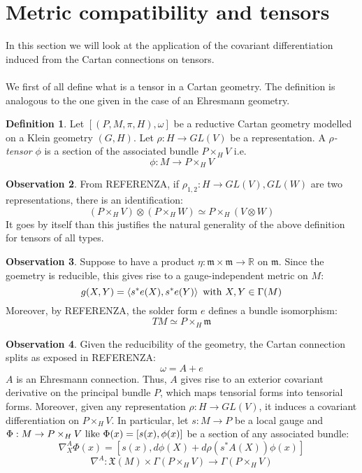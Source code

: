 \documentclass[12pt,a4paper]{report}
\theoremstyle{definition}
\newtheorem{Def}{Definition}[chapter]
\theoremstyle{Theorem}
\theoremstyle{definition}
\theoremstyle{definition}
\newtheorem{Obs}[Def]{Observation}
\begin{document}
	\section{Metric compatibility and tensors}
	In this section we will look at the application of the covariant differentiation induced from the Cartan connections on tensors.\\
	\\
	We first of all define what is a tensor in a Cartan geometry. The definition is analogous to the one given in the case of an Ehresmann geometry.
	\begin{Def}
		Let $[(P,M,\pi,H),\omega]$ be a reductive Cartan geometry modelled on a Klein geometry $(G,H)$. Let $\rho:H\rightarrow GL(V)$ be a representation. A \textit{$\rho$-tensor} $\phi$ is a section of the associated bundle $P\times_H V$ i.e.
		$$\phi:M\rightarrow P\times_H V$$ 
	\end{Def}
	\begin{Obs}
		From REFERENZA, if $\rho_{1,2}:H\rightarrow GL(V),GL(W)$ are two representations, there is an identification:
		$$(P\times_H V)\otimes (P\times_H W)\simeq P\times_H(V\otimes W)$$
		It goes by itself than this justifies the natural generality of the above definition for tensors of all types.
	\end{Obs}
		\begin{Obs}
		Suppose to have a product $\eta:\mathfrak{m}\times \mathfrak{m}\rightarrow \mathbb{R}$ on $\mathfrak{m}$. Since the goemetry is reducible, this gives rise to a gauge-independent metric on $M$:
		$$g(X,Y)=\braket{s^*e(X),s^*e(Y)}\hbox{ with }X,Y\in\Gamma(M)$$
		Moreover, by REFERENZA, the solder form $e$ defines a bundle isomorphism:
		$$TM\simeq P\times_H \mathfrak{m}$$
	\end{Obs}
	\begin{Obs}
		Given the reducibility of the geometry, the Cartan connection splits as exposed in REFERENZA:
		$$\omega=A+e$$
		$A$ is an Ehresmann connection. Thus, $A$ gives rise to an exterior covariant derivative on the principal bundle $P$, which maps tensorial forms into tensorial forms. Moreover, given any representation $\rho:H\rightarrow GL(V)$, it induces a covariant differentiation on $P\times_H V$. In particular, let $s:M\rightarrow P$ be a local gauge and $\Phi:M\rightarrow P\times_H V\hbox{ like }\Phi(x)=[s(x),\phi(x)]$ be a section of any associated bundle: 
		$$\nabla^A_X \Phi(x)=[s(x),d\phi(X)+d\rho(s^*A(X))\phi(x)]$$
		$$\nabla^A:\mathfrak{X}(M)\times\Gamma(P\times_H V)\rightarrow \Gamma(P\times_H V)$$
	\end{Obs}
\end{document}
